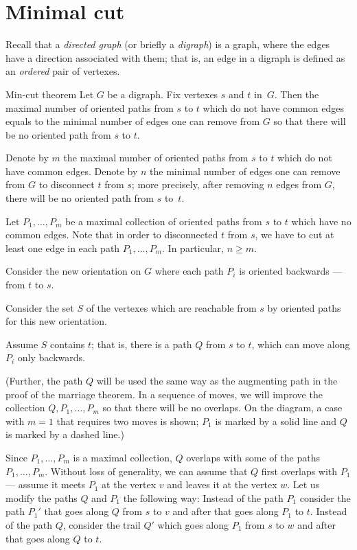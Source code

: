 \section*{Minimal cut}

Recall that a \emph{directed graph} (or briefly a \emph{digraph})
is a graph, where the edges have a direction associated with them;
that is, an edge in a digraph is defined as an {}\emph{ordered} pair of vertexes.

\begin{thm}{Min-cut theorem}
Let $G$ be a digraph. 
Fix vertexes $s$ and $t$ in~$G$.
Then the maximal number of oriented paths from $s$ to $t$ which do not have common edges equals to the minimal number of edges one can remove from $G$ so that there will be no oriented path from $s$ to $t$.
\end{thm}

Denote by $m$ the maximal number of oriented paths from $s$ to $t$ which do not have common edges.
Denote by $n$ the minimal number of edges one can remove from $G$ to disconnect $t$ from $s$; more precisely, after removing $n$ edges from $G$, there will be no oriented path from $s$ to~$t$.

Let $P_1, \dots, P_m$ be a maximal collection of oriented paths from $s$ to $t$ which have no common edges.
Note that in order to disconnected $t$ from $s$, we have to cut at least one edge in each path $P_1, \dots, P_m$.
In particular, $n\ge m$.

Consider the new orientation on $G$ where each path $P_i$ is oriented backwards --- from $t$ to $s$.

Consider the set $S$ of the vertexes which are reachable from $s$ by oriented paths for this new orientation.

Assume $S$ contains $t$; that is, there is a path $Q$ from $s$ to $t$, which
can move along $P_i$ only backwards.


(Further, the path $Q$ will be used the same way as the augmenting path in the proof of the marriage theorem.
In a sequence of moves, we will improve the collection $Q,P_1,\dots,P_m$ so that there will be no overlaps.
On the diagram, a case with $m=1$ that requires two moves is shown;
$P_1$ is marked by a solid line and $Q$ is marked by a dashed line.)

Since $P_1,\dots,P_m$ is a maximal collection, $Q$ overlaps with some of the paths $P_1,\dots,P_m$.
Without loss of generality, we can assume that $Q$ first overlaps with $P_1$ --- assume it meets $P_1$ at the vertex $v$ and leaves it at the vertex $w$.
Let us modify the paths $Q$ and $P_1$ the following way:
Instead of the path $P_1$ consider the path $P_1'$ that goes along $Q$ from $s$ to $v$ and after that goes along $P_1$ to $t$.
Instead of the path $Q$, consider the trail $Q'$ which goes along $P_1$ from $s$ to $w$ and after that goes along $Q$ to $t$.


